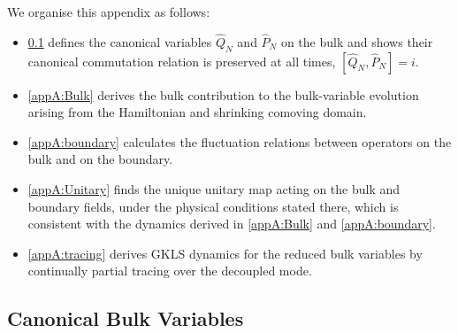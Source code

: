 \documentclass{article}
\numberwithin{equation}{section}
\begin{document}
	We organise this appendix as follows:
	\begin{itemize}
		\item \ref{appA:bulkvars} defines the canonical variables \(\hat Q_N\) and \(\hat P_N\) on the bulk and shows their canonical commutation relation is preserved at all times, \([\hat Q_N,\hat P_N]=i\). \item \ref{appA:Bulk} derives the bulk contribution to the bulk-variable evolution arising from the Hamiltonian and shrinking comoving domain. \item \ref{appA:boundary} calculates the fluctuation relations between operators on the bulk and on the boundary. \item \ref{appA:Unitary} finds the unique unitary map acting on the bulk and boundary fields, under the physical conditions stated there, which is consistent with the dynamics derived in \ref{appA:Bulk} and \ref{appA:boundary}. \item \ref{appA:tracing} derives GKLS dynamics for the reduced bulk variables by continually partial tracing over the decoupled mode.
	\end{itemize}

	\subsection{Canonical Bulk Variables}
	\label{appA:bulkvars}
\end{document}
